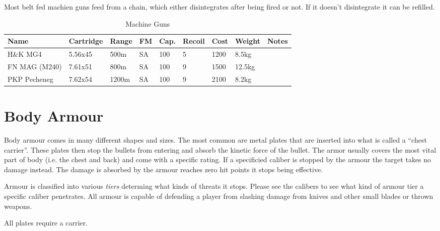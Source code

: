 Most belt fed machien guns feed from a chain, which either disintegrates after
being fired or not. If it doesn't disintegrate it can be refilled.

\begin{table}
  \caption{Machine Guns}
  \label{tab:LMG}
  \begin{center}
    \begin{tabular}{| l | l | l | l | l | l | l | l | l |}
      \hline
      \textbf{Name} & \textbf{Cartridge} & \textbf{Range} &
      \textbf{FM} & \textbf{Cap.} & \textbf{Recoil} &
      \textbf{Cost} & \textbf{Weight} & \textbf{Notes} \\ \hline


      H\&K MG4      & 5.56x45 &  500m & SA & 100 & 5 & 1200 &  8.5kg & \\ \hline
      FN MAG (M240) & 7.61x51 &  800m & SA & 100 & 9 & 1500 & 12.5kg & \\ \hline
      PKP Pecheneg  & 7.62x54 & 1200m & SA & 100 & 9 & 2100 &  8.2kg & \\ \hline

    \end{tabular}
  \end{center}
\end{table}

\section{Body Armour}
\label{sec:9-Body Armour}

Body armour comes in many different shapes and sizes. The most common are metal
plates that are inserted into what is called a ``chest carrier''. These plates
then stop the bullets from entering and absorb the kinetic force of the bullet.
The armor usually covers the most vital part of body (i.e. the chest and back)
and come with a specific rating. If a specificied caliber is stopped by the
armour the target takes no damage instead. The damage is absorbed by the armour
reaches zero hit points it stops being effective.

Armour is classified into various \emph{tiers} determing what kinds of threats
it stops. Please see the calibers to see what kind of armour tier a specific
caliber penetrates. All armour is capable of defending a player from slashing
damage from knives and other small blades or thrown weapons.

All plates require a carrier.

